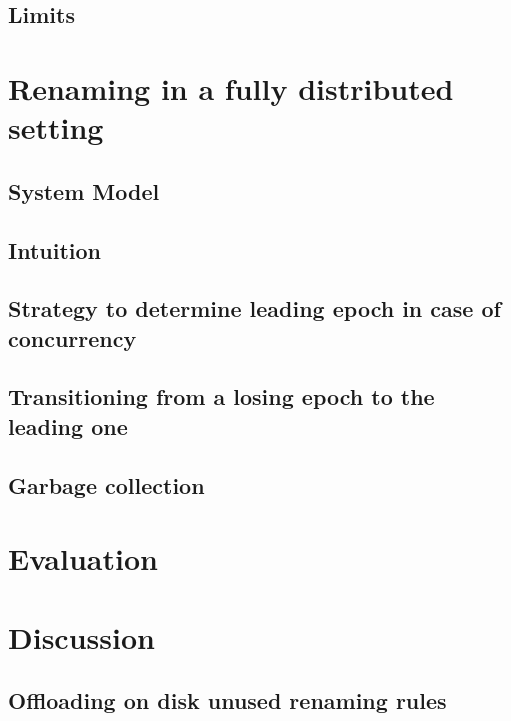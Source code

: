 \documentclass{article}
\begin{document}
\subsection{Limits}

\section{Renaming in a fully distributed setting}

\subsection{System Model}
\subsection{Intuition}
\subsection{Strategy to determine leading epoch in case of concurrency}
\subsection{Transitioning from a losing epoch to the leading one}
\subsection{Garbage collection}

\section{Evaluation}

\section{Discussion}

\subsection{Offloading on disk unused renaming rules}
\end{document}
